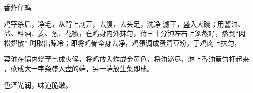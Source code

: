 \begin{recipe}[喇嘛仔鸡]{香炸仔鸡}

\ingredients


\cooking

\step 鸡宰杀后，净毛，从背上剖开，去腹，去头足，洗净-滤干，盛入大碗；用酱油、
盐、料酒、姜、葱、花椒，在鸡身内外抹匀，待三十分钟左右上笼蒸好，蒸到“肉松翅散”
时取出晾冷；即将鸡骨全身去净，鸡蛋调成蛋清豆粉，于鸡肉上抹匀。

\step 菜油在锅内烧至七成火候，将鸡放入炸成金黄色，将油泌尽，淋上香油簸匀扞起来
，砍成大一字条盛入盘的端，另一端放生菜即成。

\features

色泽光润，味道脆嫩。

\end{recipe}

